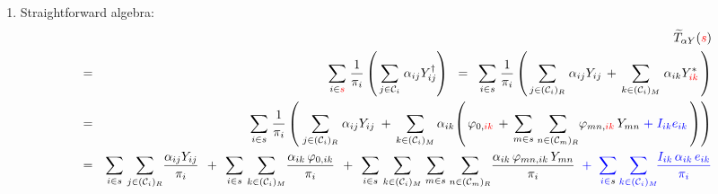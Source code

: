 \begin{enumerate}
\item
    Straightforward algebra:
    \begin{eqnarray*}
    &&
        \widetilde{T}_{\alpha Y}({\color{red}s})
    \\
    & = &
        \underset{i \in {\color{red}s}}{\sum}\;
        \dfrac{1}{\pi_{i}}\left(\,
            \underset{j \in \mathcal{C}_{i}}{\sum}\;
            \alpha_{ij}Y_{ij}^{\dagger}
            \right)
    \;\; = \;\;
        \underset{i \in {\color{black}s}}{\sum}\;
        \dfrac{1}{\pi_{i}}\left(\,
            \underset{j \in (\mathcal{C}_{i})_{R}}{\sum}\;\alpha_{ij}Y_{ij}
            \, + \,
            \underset{k \in (\mathcal{C}_{i})_{M}}{\sum}\;\alpha_{ik}Y_{{\color{red}ik}}^{*}
            \,\right)
    \\
    & = &
        \underset{i \in {\color{black}s}}{\sum}\;
        \dfrac{1}{\pi_{i}}\left(\;
            \underset{j \in (\mathcal{C}_{i})_{R}}{\sum}\;\alpha_{ij}Y_{ij}
            \; + \,
            \underset{k \in (\mathcal{C}_{i})_{M}}{\sum}\,\alpha_{ik}\!\left(\,
                \varphi_{0,{\color{red}ik}}
                \, + \,
                \underset{m \in s}{\sum}\;
                \underset{n \in (\mathcal{C}_{m})_{R}}{\sum}
                \varphi_{mn,{\color{red}ik}}\,Y_{mn}
                {\color{blue}
                \; + \;
                I_{ik}e_{ik}
                }
                \,\right)
            \right)
    \\
    & = &
        \underset{i \in {\color{black}s}}{\sum}\;
        \underset{j \in (\mathcal{C}_{i})_{R}}{\sum}
        \dfrac{
            \alpha_{ij}Y_{ij}
            }{
            \pi_{i}
            }
        \;\, + \;\,
        \underset{i \in {\color{black}s}}{\sum}\;
        \underset{k \in (\mathcal{C}_{i})_{M}}{\sum}
        \dfrac{
            \alpha_{ik}\,\varphi_{0,{\color{black}ik}}
            }{
            \pi_{i}
            }
        \;\, + \;\,
        \underset{i \in {\color{black}s}}{\sum}\;
        \underset{k \in (\mathcal{C}_{i})_{M}}{\sum}\;
        \underset{m \in s}{\sum}\;
        \underset{n \in (\mathcal{C}_{m})_{R}}{\sum}
        \dfrac{
            \alpha_{ik}\,\varphi_{mn,{\color{black}ik}}\,Y_{mn}
            }{
            \pi_{i}
            }
        {\color{blue}
        \;\; + \;\;
        \underset{i \in {\color{black}s}}{\sum}\,
        \underset{k \in (\mathcal{C}_{i})_{M}}{\sum}\!
        \dfrac{I_{ik}\,\alpha_{ik}\,e_{ik}}{\pi_{i}}
        }
    \\

\end{eqnarray*}
\end{enumerate}
